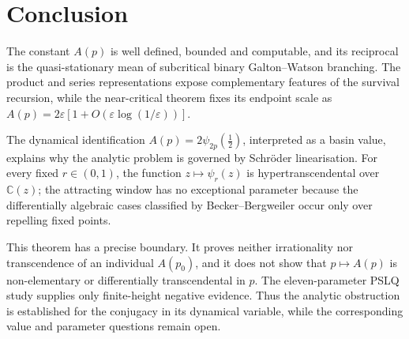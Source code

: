 \section{Conclusion}\label{a:sec:conclusion}

The constant \(A(p)\) is well defined, bounded and computable, and its reciprocal
is the quasi-stationary mean of subcritical binary Galton--Watson branching.  The
product and series representations expose complementary features of the survival
recursion, while the near-critical theorem fixes its endpoint scale as
\(A(p)=2\varepsilon[1+O(\varepsilon\log(1/\varepsilon))]\).

The dynamical identification
\(A(p)=2\psi_{2p}(\tfrac12)\), interpreted as a basin value, explains why the
analytic problem is governed by Schr\"oder linearisation.  For every fixed
\(r\in(0,1)\), the function \(z\mapsto\psi_r(z)\) is
hypertranscendental over \(\mathbb C(z)\); the attracting window has no exceptional
parameter because the differentially algebraic cases classified by
Becker--Bergweiler occur only over repelling fixed points.

This theorem has a precise boundary.  It proves neither irrationality nor
transcendence of an individual \(A(p_0)\), and it does not show that
\(p\mapsto A(p)\) is non-elementary or differentially transcendental in \(p\).
The eleven-parameter PSLQ study supplies only finite-height negative evidence.
Thus the analytic obstruction is established for the conjugacy in its dynamical
variable, while the corresponding value and parameter questions remain open.
